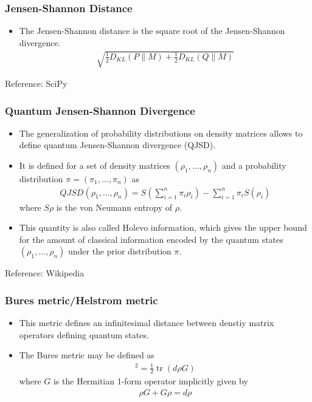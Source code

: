 \documentclass{beamer}
\begin{document}
\begin{frame}
  \frametitle{Jensen-Shannon Distance}
  \begin{itemize}
    \item The Jensen-Shannon distance is the square root of the Jensen-Shannon divergence.
          \begin{align}
            \sqrt{\frac{1}{2}D_{KL}(P\parallel M) + \frac{1}{2}D_{KL}(Q\parallel M)}
          \end{align}
  \end{itemize}
  \tiny{Reference: SciPy}
\end{frame}

\begin{frame}
  \frametitle{Quantum Jensen-Shannon Divergence}
  \begin{itemize}
    \item The generalization of probability distributions on density matrices allows to define
          quantum Jensen-Shannon divergence (QJSD).
    \item It is defined for a set of density matrices
          $(\rho_{1}, \dots, \rho_{n})$ and a probability distribution
          $\pi = (\pi_{1}, \dots, \pi_{n})$ as
          \begin{align}
            QJSD(\rho_{1}, \dots, \rho_{n}) = S(\sum_{i=1}^{n} \pi_{i} \rho_{i})
            - \sum_{i=1}^{n} \pi_{i} S(\rho_{i})
          \end{align}
          where $S{\rho}$ is the von Neumann entropy of $\rho$.
    \item This quantity is also called
          Holevo information, which gives the upper bound for the amount of
          classical information encoded by the quantum states $(\rho_{1}, \dots, \rho_{n})$
          under the prior distribution $\pi$.
  \end{itemize}
  \tiny{Reference: Wikipedia}
\end{frame}

\begin{frame}
  \frametitle{Bures metric/Helstrom metric}
  \begin{itemize}
    \item This metric defines an infinitesimal distance
          between denstiy matrix operators defining quantum states.
    \item The Bures metric may be defined as
          \begin{align}
            [ D_{B}(\rho, \rho+d\rho)]^{2} = \frac{1}{2}\operatorname{tr}(d\rho G)
          \end{align}
          where $G$ is the Hermitian 1-form operator implicitly given by
          \begin{align}
            \rho G + G \rho = d\rho
          \end{align}
  \end{itemize}
\end{frame}
\end{document}
